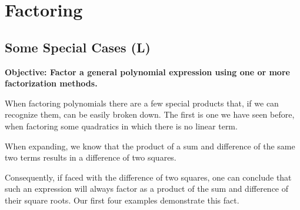 \documentclass[12pt]{book}
\theoremstyle{definition}
\begin{document}
\section{Factoring}
\subsection{Some Special Cases (L)}
{\bf Objective: Factor a general polynomial expression using one or more factorization methods.}\par
When factoring polynomials there are a few special products that, if we can recognize them, can be easily broken down. The first is one we have seen before, when factoring some quadratics in which there is no linear term.
\par
When expanding, we know that the product of a sum and difference of the same two terms results in a difference of two squares.
\begin{center}
\end{center}
Consequently, if faced with the difference of two squares, one can conclude that such an expression will always factor as a product of the
sum and difference of their square roots.  Our first four examples demonstrate this fact.
\end{document}
